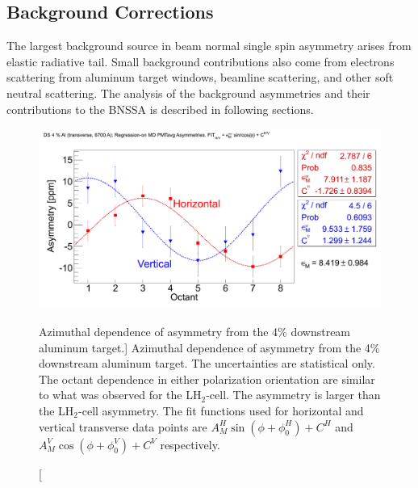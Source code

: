 


\subsection{Background Corrections}
\label{Background Corrections}

The largest background source in beam normal single spin asymmetry arises from elastic radiative tail. Small background contributions also come from electrons scattering from aluminum target windows, beamline scattering, and other soft neutral scattering. The analysis of the background asymmetries and their contributions to the BNSSA is described in following sections.


\begin{figure}[!h]
	\begin{center}
	\includegraphics[width=15.0cm]{figures/asymmetry_Al}
	\end{center}
	\caption
	[Azimuthal dependence of asymmetry from the 4\% downstream aluminum target.]
	{Azimuthal dependence of asymmetry from the 4\% downstream aluminum target. The uncertainties are statistical only. The octant dependence in either polarization orientation are similar to what was observed for the LH$_{2}$-cell. The asymmetry is larger than the LH$_{2}$-cell asymmetry. The fit functions used for horizontal and vertical transverse data points are $A_{M}^{H}\sin(\phi+\phi_{0}^{H}) + C^{H}$ and $A_{M}^{V}\cos(\phi+\phi_{0}^{V}) + C^{V}$ respectively.}
	\label{fig:asymmetry_Al}
\end{figure}

